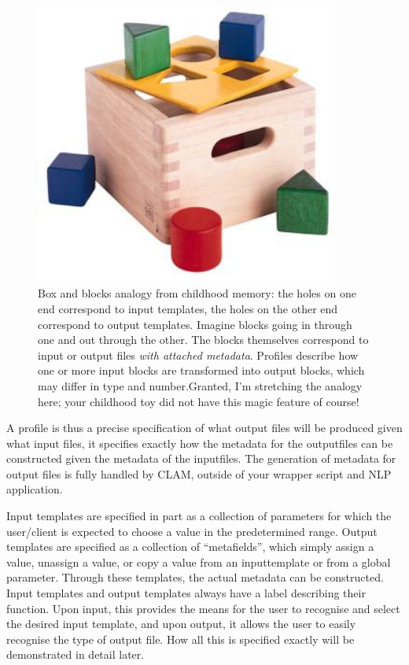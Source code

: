 \documentclass[a4paper,12pt]{report}
\begin{document}
\begin{figure}[h]
\begin{center}
\includegraphics[width=100.0mm]{blokkendoos.jpg}
\caption{Box and blocks analogy from childhood memory: the holes on one end
correspond to input templates, the holes on the other end correspond to output
templates. Imagine blocks going in through one and out through the other. The
blocks themselves correspond to input or output files \emph{with attached
metadata}. Profiles describe how one or more input blocks are transformed into
output blocks, which may differ in type and number.Granted, I'm stretching the
analogy here; your childhood toy did not have this magic feature of course!}
\label{fig:blokkendoos} 
\end{center}
\end{figure}

A profile is thus a precise specification of what output files will be produced
given what input files,  it specifies exactly how the metadata for the
outputfiles can be constructed given the metadata of the inputfiles. The
generation of metadata for output files is fully handled by CLAM, outside of
your wrapper script and NLP application.

Input templates are specified in part as a collection of parameters for which
the user/client is expected to choose a value in the predetermined range.
Output templates are specified as a collection of ``metafields'', which simply
assign a value, unassign a value, or copy a value from an inputtemplate or from
a global parameter. Through these templates, the actual metadata can be
constructed. Input templates and output templates always have a label
describing their function. Upon input, this provides the means for the user to
recognise and select the desired input template, and upon output, it allows the
user to easily recognise the type of output file. How all this is specified
exactly will be demonstrated in detail later.
\end{document}
